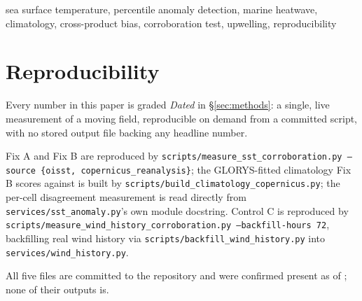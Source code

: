 \documentclass[conference]{IEEEtran}
\begin{document}
\begin{IEEEkeywords}
sea surface temperature, percentile anomaly detection, marine heatwave,
climatology, cross-product bias, corroboration test, upwelling,
reproducibility
\end{IEEEkeywords}



\section*{Reproducibility}
Every number in this paper is graded \emph{Dated} in \S\ref{sec:methods}: a
single, live measurement of a moving field, reproducible on demand from a
committed script, with no stored output file backing any headline number.
{\raggedright\sloppy
Fix A and Fix B are reproduced by
\texttt{scripts/measure\_sst\_corroboration.py --source \{oisst,
copernicus\_reanalysis\}}; the GLORYS-fitted climatology Fix B scores against
is built by \texttt{scripts/build\_climatology\_copernicus.py}; the per-cell
disagreement measurement is read directly from
\texttt{services/sst\_anomaly.py}'s own module docstring. Control C is
reproduced by \texttt{scripts/measure\_wind\_history\_corroboration.py
--backfill-hours 72}, backfilling real wind history via
\texttt{scripts/backfill\_wind\_history.py} into
\texttt{services/wind\_history.py}.\par}
All five files are committed to the repository and were confirmed present as
of \AsOf{}; none of their outputs is.



\end{document}
